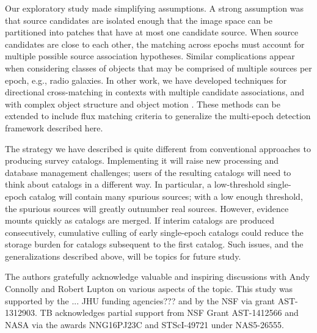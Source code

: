 \documentclass[twocolumn]{emulateapj}
\begin{document}
Our exploratory study made simplifying assumptions.
A strong assumption was that source candidates are isolated enough that the image space can be partitioned into patches that have at most one candidate source.
When source candidates are close to each other, the matching across epochs must account for multiple possible source association hypotheses.
Similar complications appear when considering classes of objects that may be comprised of multiple sources per epoch, e.g., radio galaxies.
In other work, we have developed techniques for directional cross-matching in contexts with multiple candidate associations, and with complex object structure and object motion \citep{BL15-ARSA}.
These methods can be extended to include flux matching criteria to generalize the multi-epoch detection framework described here.

The strategy we have described is quite different from conventional approaches to producing survey catalogs.
Implementing it will raise new processing and database management challenges; users of the resulting catalogs will need to think about catalogs in a different way.
In particular, a low-threshold single-epoch catalog will contain many spurious sources; with a low enough threshold, the spurious sources will greatly outnumber real sources.
However, evidence mounts quickly as catalogs are merged.
If interim catalogs are produced consecutively, cumulative culling of early single-epoch catalogs could reduce the storage burden for catalogs subsequent to the first catalog.
Such issues, and the generalizations described above, will be topics for future study.





\acknowledgements{}
The authors gratefully acknowledge valuable and inspiring discussions with Andy Connolly and Robert Lupton on various aspects of the topic.
This study was supported by the ... {\color{red}JHU funding agencies???} and by the NSF via grant AST-1312903.
%
{\color{blue}
TB acknowledges partial support from NSF Grant AST-1412566 and NASA via the awards NNG16PJ23C and STScI-49721 under NAS5-26555.}
\end{document}
